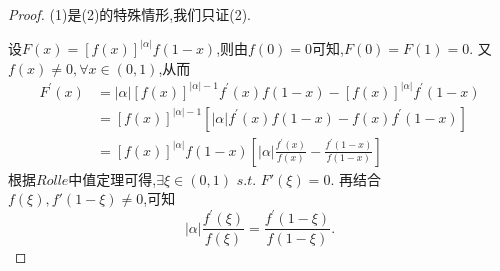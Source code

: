 \documentclass[lang=cn,newtx,10pt,scheme=chinese]{../Template/elegantbook}
\begin{document}
\begin{proof}
    (1)是(2)的特殊情形,我们只证(2).

    设$F\left( x \right) =\left[ f\left( x \right) \right] ^{\left| \alpha \right|}f\left( 1-x \right)$,则由$f(0)=0$可知,$F(0)=F(1)=0$.
    又$f(x)\ne0,\forall x\in(0,1)$,从而
    \begin{equation}
        \begin{split}
            F^{\prime}\left( x \right) &=\left| \alpha \right|\left[ f\left( x \right) \right] ^{\left| \alpha \right|-1}f^{\prime}(x)f(1-x)-\left[ f\left( x \right) \right] ^{\left| \alpha \right|}f^{\prime}(1-x)
\\
&=\left[ f\left( x \right) \right] ^{\left| \alpha \right|-1}\left[ \left| \alpha \right|f^{\prime}(x)f(1-x)-f(x)f^{\prime}(1-x) \right]
\\
&=\left[ f\left( x \right) \right] ^{\left| \alpha \right|}f(1-x)\left[ \left| \alpha \right|\frac{f^{\prime}(x)}{f(x)}-\frac{f^{\prime}(1-x)}{f(1-x)} \right]        
\end{split}
        \nonumber
    \end{equation}
    根据$Rolle$中值定理可得,$\exists \xi \in (0,1)\,\,s.t.\,\,F'\left( \xi \right) =0$.
    再结合$f(\xi),f'(1-\xi)\ne0$,可知
    \begin{equation}
        \vert\alpha\vert\frac{f^{\prime}(\xi)}{f(\xi)}=\frac{f^{\prime}(1-\xi)}{f(1-\xi)}.
        \nonumber
    \end{equation}

\end{proof}
\end{document}
